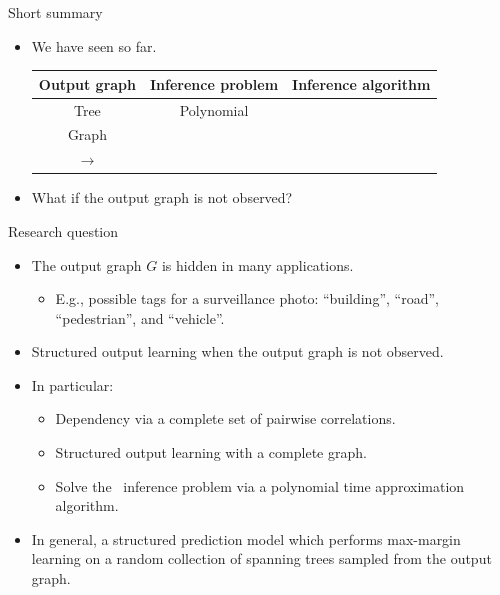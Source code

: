 \documentclass[first=dgreen,second=purple,logo=red]{aaltoslides}
\begin{document}
%
\begin{frame}{Short summary}
	\begin{itemize}\footnotesize
		\item We have seen so far. 
		\begin{tabular}{|c|c|c|}
			\hline
			\footnotesize
			 Output graph & Inference problem & Inference algorithm \\ \hline
			 Tree & Polynomial & \dpg\ \cite{Rousu07}  \\
			 Graph & \nphard & \lbp\ \cite{su10structured}  \\ 
			 $\rightarrow$ \daggraph & \nphard & \sdp\ \cite{su14structured} \\ \hline
		\end{tabular}
		\item What if the output graph is not observed?
	\end{itemize}
\end{frame}
%
\begin{frame}{Research question}
	\begin{itemize}\footnotesize
		\item The output graph $G$ is hidden in many applications.
		\begin{itemize}\footnotesize
			\item E.g., possible tags for a surveillance photo: ``building'', ``road'', ``pedestrian'', and ``vehicle''.
		\end{itemize}
		\item Structured output learning when the output graph is not observed.
		\item In particular:
		\begin{itemize}\footnotesize
			\item Dependency via a complete set of pairwise correlations.
			\item Structured output learning with a complete graph.
			\item Solve the \nphard\ inference problem via a polynomial time approximation algorithm.
		\end{itemize}
		\item In general, a structured prediction model which performs max-margin learning on a random collection of spanning trees sampled from the output graph.
	\end{itemize}
\end{frame}
\end{document}
